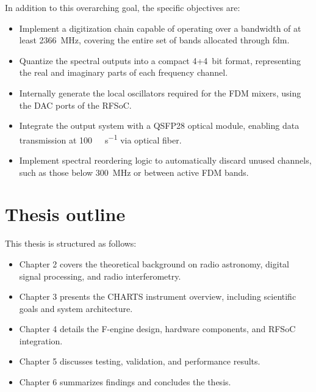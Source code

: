 In addition to this overarching goal, the specific objectives are:
\begin{itemize}
    \item Implement a digitization chain capable of operating over a bandwidth of at least \SI{2366}{\mega\hertz}, covering the entire set of bands allocated through \gls{fdm}.
    \item Quantize the spectral outputs into a compact 4+4~bit format, representing the real and imaginary parts of each frequency channel.
    \item Internally generate the local oscillators required for the FDM mixers, using the DAC ports of the RFSoC.
    \item Integrate the output system with a QSFP28 optical module, enabling data transmission at \SI{100}{\giga\bit\per\second} via optical fiber.
    \item Implement spectral reordering logic to automatically discard unused channels, such as those below \SI{300}{\mega\hertz} or between active FDM bands.
\end{itemize}

\section{Thesis outline}
This thesis is structured as follows:
\begin{itemize}
    \item Chapter 2 covers the theoretical background on radio astronomy, digital signal processing, and radio interferometry.
    \item Chapter 3 presents the CHARTS instrument overview, including scientific goals and system architecture.
    \item Chapter 4 details the F-engine design, hardware components, and RFSoC integration.
    \item Chapter 5 discusses testing, validation, and performance results.
    \item Chapter 6 summarizes findings and concludes the thesis.
\end{itemize}
